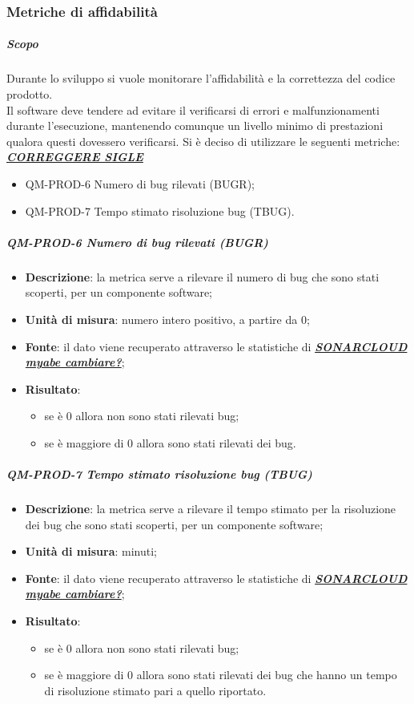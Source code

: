		\subsubsection{Metriche di affidabilità}
			\subparagraph{Scopo}
			Durante lo sviluppo si vuole monitorare l’affidabilità e la correttezza del codice prodotto.\\
			Il software deve tendere ad evitare il verificarsi di errori e malfunzionamenti durante l'esecuzione, mantenendo comunque un livello minimo di prestazioni qualora questi dovessero verificarsi.
			Si è deciso di utilizzare le seguenti metriche:
			\\
			\textit{\underline{\textbf{CORREGGERE SIGLE}}}
			\begin{itemize}
				\item QM-PROD-6 Numero di bug rilevati (BUGR);
				\item QM-PROD-7 Tempo stimato risoluzione bug (TBUG).
			\end{itemize}
			\subparagraph{QM-PROD-6 Numero di bug rilevati (BUGR)}
			\begin{itemize}
				\item \textbf{Descrizione}: la metrica serve a rilevare il numero di bug che sono stati scoperti, per un componente software;
				\item \textbf{Unità di misura}: numero intero positivo, a partire da 0;
				\item \textbf{Fonte}: il dato viene recuperato attraverso le statistiche di \textbf{\textit{\underline{SONARCLOUD myabe cambiare?}}};
				\item \textbf{Risultato}:
				\begin{itemize}
					\item se è 0 allora non sono stati rilevati bug;
					\item se è maggiore di 0 allora sono stati rilevati dei bug.
				\end{itemize}
			\end{itemize}
			\subparagraph{QM-PROD-7 Tempo stimato risoluzione bug (TBUG)}
			\begin{itemize}
				\item \textbf{Descrizione}: la metrica serve a rilevare il tempo stimato per la risoluzione dei bug che sono stati scoperti, per un componente software;
				\item \textbf{Unità di misura}: minuti;
				\item \textbf{Fonte}: il dato viene recuperato attraverso le statistiche di \textbf{\textit{\underline{SONARCLOUD myabe cambiare?}}};
				\item \textbf{Risultato}:
				\begin{itemize}
					\item se è 0 allora non sono stati rilevati bug;
					\item se è maggiore di 0 allora sono stati rilevati dei bug che hanno un tempo di risoluzione stimato pari a quello riportato.
				\end{itemize}
			\end{itemize}
		
